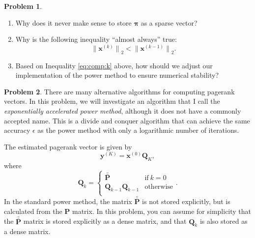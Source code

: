 \documentclass[10pt]{article}
\theoremstyle{definition}
\newtheorem{problem}{Problem}
\newcommand{\Q}{\mathbf Q}
\newcommand{\p}{\mathbf P}
\newcommand{\pb}{\bar {\p}}
\newcommand{\pbb}{\bar {\pb}}
\newcommand{\pr}{\bm \pi}
\newcommand{\x}{\mathbf x}
\newcommand{\y}{\mathbf y}
\newcommand{\ltwo}[1]{{\lVert {#1} \rVert}_2}
\begin{document}
{\begin{problem}
\begin{enumerate}

            \newpage
        \item
            Why does it never make sense to store $\pr$ as a sparse vector?
            \vspace{2in}

            \newpage
        \item
            Why is the following inequality ``almost always'' true:
            \begin{equation}
                \label{eq:comp:k}
                \ltwo{\x^{(k)}} < \ltwo{\x^{(k-1)}}
                .
            \end{equation}
            \vspace{4in}
        \item
            Based on Inequality \eqref{eq:comp:k} above,
            how should we adjust our implementation of the power method to ensure numerical stability?

    \end{enumerate}
\end{problem}


\newpage
\begin{problem}
    There are many alternative algorithms for computing pagerank vectors.
    In this problem, we will investigate an algorithm that I call the \emph{exponentially accelerated power method},
    although it does not have a commonly accepted name.
    This is a divide and conquer algorithm that can achieve the same accuracy $\epsilon$ as the power method with only a logarithmic number of iterations.

    The estimated pagerank vector is given by
    \begin{equation}
        \label{eq:exp:y}
        \y^{(K)} = \x^{(0)} \Q_K
        ,
    \end{equation}
    where
    \begin{equation}
        \Q_k = 
        \begin{cases}
            \pbb & \text{if}~k=0 \\
            \Q_{k-1} \Q_{k-1} & \text{otherwise} \\
        \end{cases}
        .
    \end{equation}
    In the standard power method, the matrix $\pbb$ is not stored explicitly,
    but is calculated from the $\p$ matrix.
    In this problem, you can assume for simplicity that the $\pbb$ matrix is stored explicitly as a dense matrix,
    and that $\Q_k$ is also stored as a dense matrix.


\end{problem}}
\end{document}
